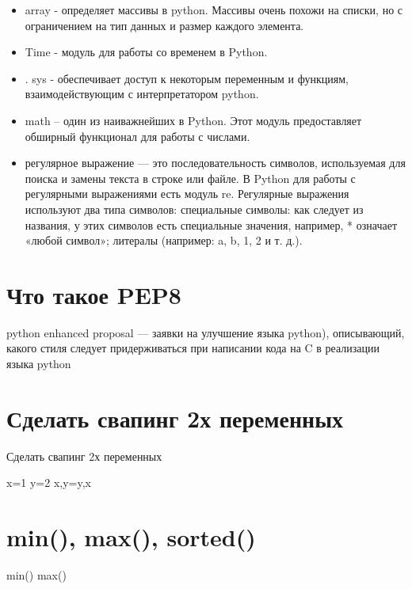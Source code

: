 \begin{itemize}
		\item array - определяет массивы в python. Массивы очень похожи на списки, но с ограничением на тип данных и размер каждого элемента.
		\item Time - модуль для работы со временем в Python.
		\item. sys - обеспечивает доступ к некоторым переменным и функциям, взаимодействующим с интерпретатором python.
		\item math – один из наиважнейших в Python. Этот модуль предоставляет обширный функционал для работы с числами.
		\item регулярное выражение — это последовательность символов, используемая для поиска и замены текста в строке или файле. В Python для работы с регулярными выражениями есть модуль re. Регулярные выражения используют два типа символов: специальные символы: как следует из названия, у этих символов есть специальные значения, например, * означает «любой символ»; литералы (например: a, b, 1, 2 и т. д.).
	\end{itemize}

\section{Что такое PEP8}

python enhanced proposal — заявки на улучшение языка python), описывающий, какого стиля следует придерживаться при написании кода на C в реализации языка python

\section{Сделать свапинг 2х переменных}	

Сделать свапинг 2х переменных
	\begin{python}
		x=1
		y=2
		x,y=y,x
	\end{python}

\section{min(), max(), sorted()}

	min() max()

